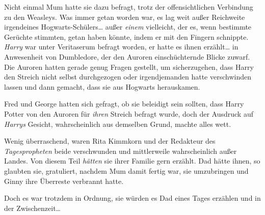 Nicht einmal Mum hatte sie dazu befragt, trotz der offensichtlichen Verbindung zu den Weasleys. Was immer getan worden war, es lag weit außer Reichweite irgendeines Hogwarts-Schülers… außer \emph{einem} vielleicht, der es, wenn bestimmte Gerüchte stimmten, getan haben könnte, indem er mit den Fingern schnippte. \emph{Harry} war unter Veritaserum befragt worden, er hatte es ihnen erzählt… in Anwesenheit von Dumbledore, der den Auroren einschüchternde Blicke zuwarf. Die Auroren hatten gerade genug Fragen gestellt, um sicherzugehen, dass Harry den Streich nicht selbst durchgezogen oder irgendjemanden hatte verschwinden lassen und dann gemacht, dass sie aus Hogwarts herauskamen.

Fred und George hatten sich gefragt, ob sie beleidigt sein sollten, dass Harry Potter von den Auroren für \emph{ihren} Streich befragt wurde, doch der Ausdruck auf \emph{Harrys} Gesicht, wahrscheinlich aus demselben Grund, machte alles wett.

Wenig überraschend, waren Rita Kimmkorn und der Redakteur des \emph{Tagespropheten} beide verschwunden und mittlerweile wahrscheinlich außer Landes. Von diesem Teil \emph{hätten} sie ihrer Familie gern erzählt. Dad hätte ihnen, so glaubten sie, gratuliert, nachdem Mum damit fertig war, sie umzubringen und Ginny ihre Überreste verbrannt hatte.

Doch es war trotzdem in Ordnung, sie würden es Dad eines Tages erzählen und in der Zwischenzeit…


